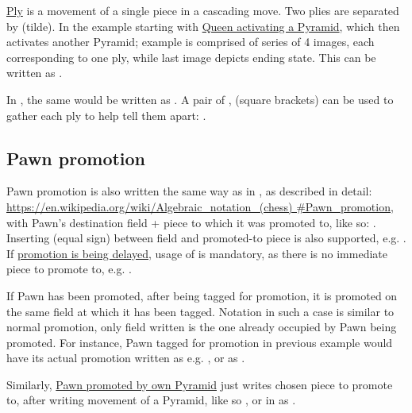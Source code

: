 \hyperref[sec:Terms/Ply]{Ply} is a movement of a single piece in a cascading move. Two plies
are separated by \alg{\textasciitilde{}} (tilde). In the example starting with
\hyperref[fig:scn_ma_15_cascading_init]{Queen activating a Pyramid}, which then activates
another Pyramid; example is comprised of series of 4 images, each corresponding to one ply,
while last image depicts ending state. This can be written as
.

In , the same would be written as\newline
{}. A pair of \alg{[}, \alg{]}
(square brackets) can be used to gather each ply to help tell them apart:\newline
\alg{[Qk2-f7]\textasciitilde{}[Af7-i7]\textasciitilde{}[Ai7-i9]}.

\subsection*{Pawn promotion}
\label{sec:Appendix/Notation/Pawn promotion}

Pawn promotion is also written the same way as in , as described in detail:\newline
\href{https://en.wikipedia.org/wiki/Algebraic\_notation\_(chess)\#Pawn\_promotion}{https://en.wikipedia.org/wiki/Algebraic\_notation\_(chess)\newline
\#Pawn\_promotion}, with Pawn's destination field + piece to which it was promoted to,
like so: . Inserting \alg{=} (equal sign) between field and promoted-to piece
is also supported, e.g. .
If \hyperref[fig:scn_aoa_05_delayed_promo_pawn_2_moved]{promotion is being delayed}, usage
of \alg{=} is mandatory, as there is no immediate piece to promote to, e.g. .

If Pawn has been promoted, after being tagged for promotion, it is promoted on the same
field at which it has been tagged. Notation in such a case is similar to normal promotion,
only field written is the one already occupied by Pawn being promoted. For instance, Pawn
tagged for promotion in previous example would have its actual promotion written as e.g.
, or as .

Similarly, \hyperref[fig:scn_ma_05_promo_init]{Pawn promoted by own Pyramid} just writes
chosen piece to promote to, after writing movement of a Pyramid, like so
, or in  as
\alg{[El4-d8]\textasciitilde{}[Ad8-h8=Q]}.

